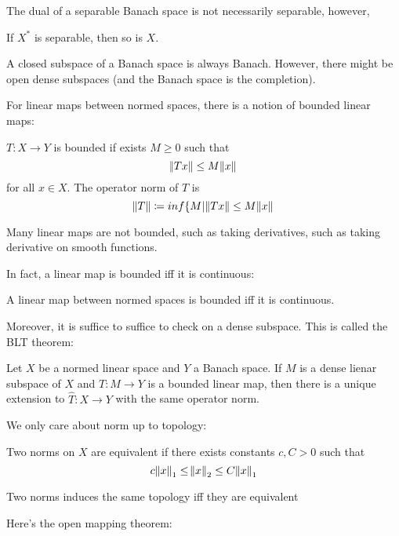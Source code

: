 \documentclass[main.tex]{subfiles}
\begin{document}
The dual of a separable Banach space is not necessarily separable, however, 

\begin{proposition}
If $X^*$ is separable, then so is $X$.
\end{proposition}


A closed subspace of a Banach space is always Banach. However, there might be open dense subspaces (and the Banach space is the completion).

For linear maps between normed spaces, there is a notion of bounded linear maps:

\begin{definition}
$T: X \rightarrow Y$ is bounded if exists $M \geq 0$ such that 
$$
\norm{Tx} \leq M \norm{x}
$$
for all $x \in X$. The operator norm of $T$ is 
$$
\norm{T} \coloneqq inf \{ M | \norm{Tx} \leq M \norm{x}
$$
\end{definition}


Many linear maps are not bounded, such as taking derivatives, such as taking derivative on smooth functions. 

In fact, a linear map is bounded iff it is continuous:

\begin{theorem}
A linear map between normed spaces is bounded iff it is continuous.
\end{theorem}

Moreover, it is suffice to suffice to check on a dense subspace. This is called the BLT theorem:

\begin{theorem}
Let $X$ be a normed linear space and $Y$ a Banach space. If $M$ is a dense lienar subspace of $X$ and $T: M \rightarrow Y$ is a bounded linear map, then there is a unique extension to $\hat{T}: X \rightarrow Y$ with the same operator norm.
\end{theorem}

We only care about norm up to topology:

\begin{definition}
Two norms on $X$ are equivalent if there exists constants $c , C > 0$ such that 
$$
c\norm{x}_1 \leq \norm{x}_2 \leq C\norm{x}_1
$$
\end{definition}

\begin{theorem}
Two norms induces the same topology iff they are equivalent
\end{theorem}

Here's the open mapping theorem:
\end{document}
